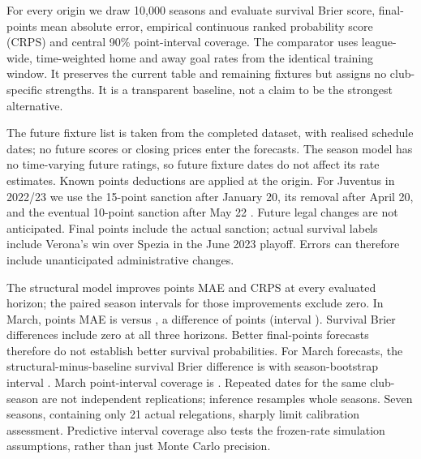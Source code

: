 \documentclass[11pt]{article}
\begin{document}
For every origin we draw 10,000 seasons and evaluate survival Brier score,
final-points mean absolute error, empirical continuous ranked probability score
(CRPS) and central 90\% point-interval coverage. The comparator uses league-wide,
time-weighted home and away goal rates from the identical training window.
It preserves the current table and remaining fixtures but assigns no
club-specific strengths. It is a transparent baseline, not a claim to be the
strongest alternative.

The future fixture list is taken from the completed dataset, with realised
schedule dates; no future scores or closing prices enter the forecasts.
The season model has no time-varying future ratings, so future fixture dates do
not affect its rate estimates. Known points deductions are applied at the
origin. For Juventus in 2022/23 we use the 15-point sanction after January 20,
its removal after April 20, and the eventual 10-point sanction after May 22
\citep{juve15,juveappeal,juve10}. Future legal changes are not anticipated.
Final points include the actual sanction; actual survival labels include
Verona's win over Spezia in the June 2023 playoff. Errors can therefore
include unanticipated administrative changes.

\begin{table}[ht]
\centering
\caption{All-club retrospective season evaluation. Each row contains 140
club-season forecasts. Survival uses binary Brier score; point coverage is
for a nominal central 90\% interval.}

\end{table}

The structural model improves points MAE and CRPS at every evaluated horizon;
the paired season intervals for those improvements exclude zero. In March,
points MAE is \SeasonMarchMAE{} versus \SeasonMarchBaselineMAE{}, a difference
of \SeasonMarchMAEDifference{} points (interval \SeasonMarchMAECI{}).
Survival Brier differences include zero at all three horizons. Better
final-points forecasts therefore do not establish better survival probabilities.
For March forecasts, the structural-minus-baseline survival Brier difference is
\SeasonMarchDifference{} with season-bootstrap interval
\SeasonMarchDifferenceCI{}. March point-interval coverage is
\SeasonMarchCoverage{}. \SeasonInterpretation{}
Repeated dates for the same club-season are not independent replications;
inference resamples whole seasons. Seven seasons, containing only 21 actual
relegations, sharply limit calibration assessment. Predictive interval
coverage also tests the frozen-rate simulation assumptions, rather than just
Monte Carlo precision.
\end{document}
